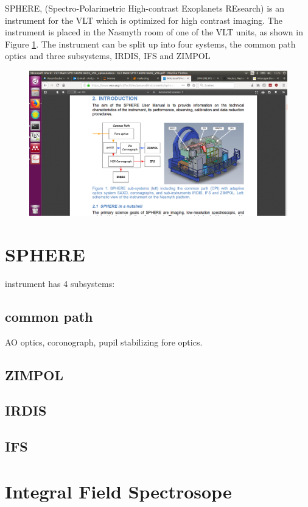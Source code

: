 \documentclass[twoside,single]{lion-msc}
\begin{document}
SPHERE, (Spectro-Polarimetric High-contrast Exoplanets REsearch) is an instrument for the VLT which is optimized for high contrast imaging. The instrument is placed in the Nasmyth room of one of the VLT units, as shown in Figure \ref{Fig:overviewSPHERE}. The instrument can be split up into four systems, the common path optics and three subsystems, IRDIS, IFS and ZIMPOL\\ 

\begin{figure}[htbp]
\centering
\includegraphics[trim={12cm 6cm 7cm 8.8cm},clip,scale = 0.47]{overviewSPHERE}
\caption{} 
\label{Fig:overviewSPHERE}
\end{figure}


\section{SPHERE}
instrument has 4 subsystems:\\
\subsection{common path}
AO optics, coronograph, pupil stabilizing fore optics.
\subsection{ZIMPOL}
\subsection{IRDIS}
\subsection{IFS}

\section{Integral Field Spectrosope}
\end{document}
